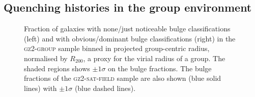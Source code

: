 \subsection{Quenching histories in the group environment}\label{sec:resultssfhs}

\begin{figure}
\caption[Bulge fraction with group radius in the \textsc{gz2-group} sample]{Fraction of galaxies with none/just noticeable bulge classifications (left) and with obvious/dominant bulge classifications (right) in the \textsc{gz2-group} sample binned in projected group-centric radius, normalised by $R_{200}$, a proxy for the virial radius of a group. The shaded regions shows $\pm1\sigma$ on the bulge fractions. The bulge fractions of the \textsc{gz2-sat-field} sample are also shown (blue solid lines) with $\pm1\sigma$ (blue dashed lines).}
\label{fig:bulgeradius}
\end{figure}

